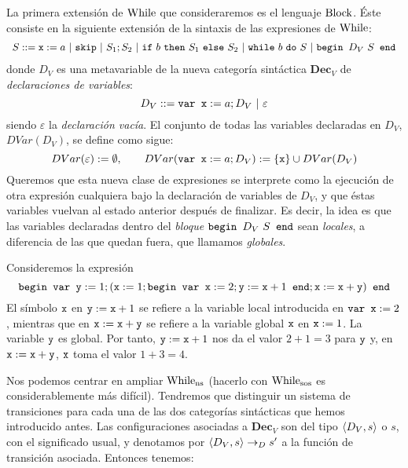 La primera extensión de $\mathrm{While}$ que consideraremos es el lenguaje $\mathrm{Block}$. Éste consiste en la siguiente extensión de la sintaxis de las expresiones de $\mathrm{While}$:
\[
    \begin{array}{l}
         S ::= \n{x}:=a\ |\ \n{skip}\ |\ S_1;S_2\ |\ \n{if}\ b\ \n{then}\ S_1\ \n{else}\ S_2\ |\ \n{while}\ b\ \n{do}\ S \ | \ \n{begin } D_V \  S \n{ end}
    \end{array}
\]
donde $D_V$ es una metavariable de la nueva categoría sintáctica $\textbf{Dec}_V$ de \textit{declaraciones de variables}:
\[
    D_V ::= \texttt{var x} := a; D_V\ |\ \varepsilon
\]
siendo $\varepsilon$ la \textit{declaración vacía}. El conjunto de todas las variables declaradas en $D_V$, $DVar(D_V)$, se define como sigue:
$$DVar(\varepsilon):= \emptyset, \quad \quad DVar(\texttt{var x}:=a; D_V) := \{\texttt{x}\}\cup DVar(D_V)$$
Queremos que esta nueva clase de expresiones se interprete como la ejecución de otra expresión cualquiera bajo la declaración de variables de $D_V$, y que éstas variables vuelvan al estado anterior después de finalizar. Es decir, la idea es que las variables declaradas dentro del \textit{bloque} $\texttt{begin } D_V \  S \texttt{ end}$ sean \textit{locales}, a diferencia de las que quedan fuera, que llamamos \textit{globales}.

\begin{example}
Consideremos la expresión $$\texttt{begin var y} := 1; (\texttt{x}:=1; \texttt{begin var x}:= 2 ; \texttt{y}:=\texttt{x}+1 \texttt{ end}; \texttt{x}:=\texttt{x}+\texttt{y}) \texttt{ end}$$
El símbolo $\texttt{x}$ en $\texttt{y}:= \texttt{x}+1$ se refiere a la variable local introducida en $\texttt{var x}:=2$, mientras que en $\texttt{x}:= \texttt{x}+\texttt{y}$ se refiere a la variable global $\texttt{x}$ en $\texttt{x}:=1$. La variable $\texttt{y}$ es global. Por tanto, $\texttt{y}:=\texttt{x}+1$ nos da el valor $2 + 1 = 3$ para $\texttt{y}$ y, en $\texttt{x}:=\texttt{x}+\texttt{y}$, $\texttt{x}$ toma el valor $1 + 3 = 4$.
\end{example}

Nos podemos centrar en ampliar $\mathrm{While}_{\mathrm{ns}}$ (hacerlo con $\mathrm{While}_{\mathrm{sos}}$ es considerablemente más difícil). Tendremos que distinguir un sistema de transiciones para cada una de las dos categorías sintácticas que hemos introducido antes. Las configuraciones asociadas a $\textbf{Dec}_V$ son del tipo $\langle D_V, s \rangle$ o $s$, con el significado usual, y denotamos por $\langle D_V, s \rangle\to_D s'$ a la función de transición asociada. Entonces tenemos:


